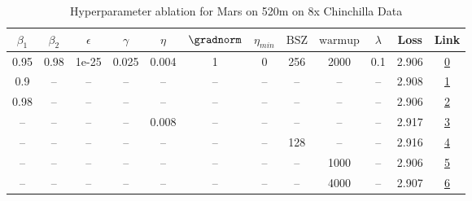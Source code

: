 \begin{table}[H]
\centering
\caption{Hyperparameter ablation for Mars on 520m on 8x Chinchilla Data}
\label{tab:ablation_mars_520m_on_8x_chinchilla_data}
\begin{tabular}{cccccccccccc}
\toprule
$\beta_1$ & $\beta_2$ & $\epsilon$ & $\gamma$ & $\eta$ & $\gradnorm$ & $\eta_{min}$ & $\mathrm{BSZ}$ & $\mathrm{warmup}$ & $\lambda$ & Loss & Link \\
\midrule
0.95 & 0.98 & 1e-25 & 0.025 & 0.004 & 1 & 0 & 256 & 2000 & 0.1 & 2.906 & \href{https://wandb.ai/stanford-mercury/optimizer-scaling/runs/sweep-520m-85B-mars995e4flr0.004-wd0.1-minlr0-warmup2000-b10.95--18e62c}{0} \\
\midrule
0.9 & -- & -- & -- & -- & -- & -- & -- & -- & -- & 2.908 & \href{https://wandb.ai/stanford-mercury/optimizer-scaling/runs/sweep-520m-85B-mars277fd9lr0.004-wd0.1-minlr0-warmup2000-b10.9-b-4a0179}{1} \\
0.98 & -- & -- & -- & -- & -- & -- & -- & -- & -- & 2.906 & \href{https://wandb.ai/stanford-mercury/optimizer-scaling/runs/sweep-520m-85B-marsb6a610lr0.004-wd0.1-minlr0-warmup2000-b10.98--b56c02}{2} \\
-- & -- & -- & -- & 0.008 & -- & -- & -- & -- & -- & 2.917 & \href{https://wandb.ai/stanford-mercury/optimizer-scaling/runs/sweep-520m-85B-marsf698a0lr0.008-wd0.1-minlr0-warmup2000-b10.95--ce7d2d}{3} \\
-- & -- & -- & -- & -- & -- & -- & 128 & -- & -- & 2.916 & \href{https://wandb.ai/stanford-mercury/optimizer-scaling/runs/sweep-520m-85B-marse53488lr0.004-wd0.1-minlr0-warmup2000-b10.95--77623f}{4} \\
-- & -- & -- & -- & -- & -- & -- & -- & 1000 & -- & 2.906 & \href{https://wandb.ai/stanford-mercury/optimizer-scaling/runs/sweep-520m-85B-mars1c70a7lr0.004-wd0.1-minlr0-warmup1000-b10.95--ef2ded}{5} \\
-- & -- & -- & -- & -- & -- & -- & -- & 4000 & -- & 2.907 & \href{https://wandb.ai/stanford-mercury/optimizer-scaling/runs/sweep-520m-85B-mars8bc425lr0.004-wd0.1-minlr0-warmup4000-b10.95--65ac2e}{6} \\
\bottomrule
\end{tabular}
\end{table}

